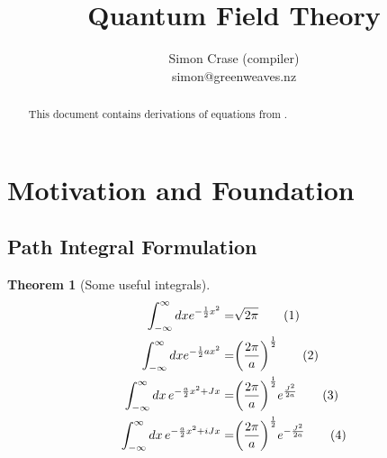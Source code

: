 \documentclass[]{article}
\title{Quantum Field Theory}
\author{Simon Crase (compiler)\\simon@greenweaves.nz}
\newcommand\numberthis{\addtocounter{equation}{1}\tag{\theequation}}
\newtheorem{thm}{Theorem}
\begin{document}
\maketitle

\begin{abstract}

This document contains derivations of equations from \cite{zee2010quantum}.

\end{abstract}

\tableofcontents

\section{Motivation and Foundation}

\subsection{Path Integral Formulation}

\begin{thm}[Some useful integrals]
	\begin{align*}
		\int_{-\infty}^{\infty} dx e^{-\frac{1}{2}x^2} =& \sqrt{2\pi} \numberthis \label{eq:integral:gaussian0}\\
		\int_{-\infty}^{\infty} dx e^{-\frac{1}{2}ax^2} =& \bigg(\frac{2\pi}{a}\bigg)^\frac{1}{2} \numberthis \label{eq:integral:gaussian}\\
		\int_{-\infty}^{\infty} dx\,e^{-\frac{a}{2} x^2+Jx}=&\bigg(\frac{2\pi}{a}\bigg)^\frac{1}{2}e^\frac{J^2}{2a} \numberthis \label{eq:integral:gaussian1}\\
		\int_{-\infty}^{\infty} dx\,e^{-\frac{a}{2} x^2+iJx}=&\bigg(\frac{2\pi}{a}\bigg)^\frac{1}{2}e^{-\frac{J^2}{2a}} \numberthis \label{eq:integral:gaussian2}
	\end{align*}
\end{thm}
\end{document}
